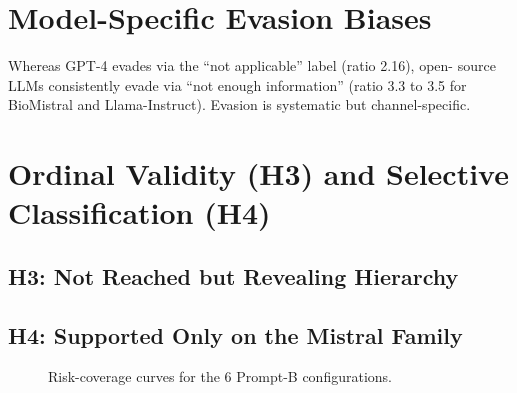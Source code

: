 \section{Model-Specific Evasion Biases}
\label{sec:res-evasion}


\begin{finding}
    Whereas GPT-4 evades via the ``not applicable'' label (ratio 2.16), open-
    source LLMs consistently evade via ``not enough information'' (ratio 3.3
    to 3.5 for BioMistral and Llama-Instruct). Evasion is systematic but
    channel-specific.
\end{finding}

\section{Ordinal Validity (H3) and Selective Classification (H4)}
\label{sec:res-h3h4}

\subsection{H3: Not Reached but Revealing Hierarchy}
\label{subsec:res-h3}


\subsection{H4: Supported Only on the Mistral Family}
\label{subsec:res-h4}


\begin{figure}[htbp]
    \centering
    \caption{Risk-coverage curves for the 6 Prompt-B configurations.}
    \label{fig:res-riskcov}
\end{figure}

